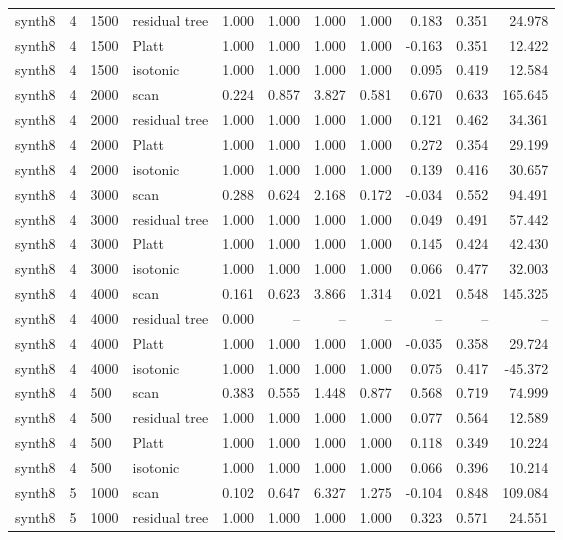 \begin{tabular}{lrllrrrrrrr}
synth8 & 4 & 1500 & residual tree & 1.000 & 1.000 & 1.000 & 1.000 & 0.183 & 0.351 & 24.978 \\
synth8 & 4 & 1500 & Platt & 1.000 & 1.000 & 1.000 & 1.000 & -0.163 & 0.351 & 12.422 \\
synth8 & 4 & 1500 & isotonic & 1.000 & 1.000 & 1.000 & 1.000 & 0.095 & 0.419 & 12.584 \\
synth8 & 4 & 2000 & scan & 0.224 & 0.857 & 3.827 & 0.581 & 0.670 & 0.633 & 165.645 \\
synth8 & 4 & 2000 & residual tree & 1.000 & 1.000 & 1.000 & 1.000 & 0.121 & 0.462 & 34.361 \\
synth8 & 4 & 2000 & Platt & 1.000 & 1.000 & 1.000 & 1.000 & 0.272 & 0.354 & 29.199 \\
synth8 & 4 & 2000 & isotonic & 1.000 & 1.000 & 1.000 & 1.000 & 0.139 & 0.416 & 30.657 \\
synth8 & 4 & 3000 & scan & 0.288 & 0.624 & 2.168 & 0.172 & -0.034 & 0.552 & 94.491 \\
synth8 & 4 & 3000 & residual tree & 1.000 & 1.000 & 1.000 & 1.000 & 0.049 & 0.491 & 57.442 \\
synth8 & 4 & 3000 & Platt & 1.000 & 1.000 & 1.000 & 1.000 & 0.145 & 0.424 & 42.430 \\
synth8 & 4 & 3000 & isotonic & 1.000 & 1.000 & 1.000 & 1.000 & 0.066 & 0.477 & 32.003 \\
synth8 & 4 & 4000 & scan & 0.161 & 0.623 & 3.866 & 1.314 & 0.021 & 0.548 & 145.325 \\
synth8 & 4 & 4000 & residual tree & 0.000 & -- & -- & -- & -- & -- & -- \\
synth8 & 4 & 4000 & Platt & 1.000 & 1.000 & 1.000 & 1.000 & -0.035 & 0.358 & 29.724 \\
synth8 & 4 & 4000 & isotonic & 1.000 & 1.000 & 1.000 & 1.000 & 0.075 & 0.417 & -45.372 \\
synth8 & 4 & 500 & scan & 0.383 & 0.555 & 1.448 & 0.877 & 0.568 & 0.719 & 74.999 \\
synth8 & 4 & 500 & residual tree & 1.000 & 1.000 & 1.000 & 1.000 & 0.077 & 0.564 & 12.589 \\
synth8 & 4 & 500 & Platt & 1.000 & 1.000 & 1.000 & 1.000 & 0.118 & 0.349 & 10.224 \\
synth8 & 4 & 500 & isotonic & 1.000 & 1.000 & 1.000 & 1.000 & 0.066 & 0.396 & 10.214 \\
synth8 & 5 & 1000 & scan & 0.102 & 0.647 & 6.327 & 1.275 & -0.104 & 0.848 & 109.084 \\
synth8 & 5 & 1000 & residual tree & 1.000 & 1.000 & 1.000 & 1.000 & 0.323 & 0.571 & 24.551 \\

\end{tabular}
